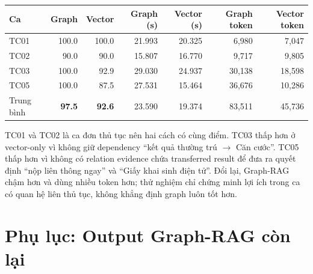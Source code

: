 \documentclass[11pt,a4paper]{article}
\begin{document}
\begin{center}
\begin{tabular}{lrrrrrr}
\toprule
Ca & Graph & Vector & Graph (s) & Vector (s) & Graph token & Vector token\\
\midrule
TC01 & 100.0 & 100.0 & 21.993 & 20.325 & 6,980 & 7,047\\
TC02 & 90.0 & 90.0 & 15.807 & 16.770 & 9,717 & 9,805\\
TC03 & 100.0 & 92.9 & 29.030 & 24.937 & 30,138 & 18,598\\
TC05 & 100.0 & 87.5 & 27.531 & 15.464 & 36,676 & 10,286\\
\midrule
Trung bình & \textbf{97.5} & \textbf{92.6} & 23.590 & 19.374 & 83,511 & 45,736\\
\bottomrule
\end{tabular}
\end{center}

TC01 và TC02 là ca đơn thủ tục nên hai cách có cùng điểm. TC03 thấp hơn ở vector-only vì không giữ dependency “kết quả thường trú $\rightarrow$ Căn cước”. TC05 thấp hơn vì không có relation evidence chứa transferred result để đưa ra quyết định “nộp liên thông ngay” và “Giấy khai sinh điện tử”. Đổi lại, Graph-RAG chậm hơn và dùng nhiều token hơn; thử nghiệm chỉ chứng minh lợi ích trong ca có quan hệ liên thủ tục, không khẳng định graph luôn tốt hơn.

\clearpage
\section{Phụ lục: Output Graph-RAG còn lại}
\end{document}

